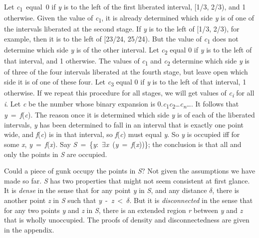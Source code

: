 Let \textit{c}\textsubscript{1}~equal~0 if \textit{y} is to the left of the first liberated interval, [1/3, 2/3), and 1 otherwise. Given the value of \textit{c}\textsubscript{1}, it is already determined which side \textit{y} is of one of the intervals liberated at the second stage. If \textit{y} is to the left of [1/3, 2/3), for example, then it is to the left of [23/24, 25/24). But the value of \textit{c}\textsubscript{1} does not determine which side \textit{y} is of the other interval. Let \textit{c}\textsubscript{2} equal 0 if \textit{y} is to the left of that interval, and 1 otherwise. The values of \textit{c}\textsubscript{1} and \textit{c}\textsubscript{2} determine which side \textit{y} is of three of the four intervals liberated at the fourth stage, but leave open which side it is of one of these four. Let \textit{c}\textsubscript{3} equal 0 if \textit{y} is to the left of that interval, 1 otherwise. If we repeat this procedure for all stages, we will get values of \textit{c}\textit{\textsubscript{i}} for all \textit{i}. Let \textit{c} be the number whose binary expansion is 0.\textit{c}\textsubscript{1}\textit{c}\textsubscript{2}{\dots}\textit{c}\textit{\textsubscript{n}}{\dots}. It follows that \textit{y}~=~\textit{f}(\textit{c}). The reason once it is determined which side \textit{y} is of each of the liberated intervals, \textit{y} has been determined to fall in an interval that is exactly one point wide, and \textit{f}(\textit{c}) is in that interval, so \textit{f}(\textit{c}) must equal \textit{y}. So \textit{y} is occupied iff for some \textit{x}, \textit{y}~=~\textit{f}(\textit{x}). Say \textit{S}~=~\{\textit{y}:~${\exists}$\textit{x}~(\textit{y}~=~\textit{f}(\textit{x}))\}; the conclusion is that all and only the points in \textit{S} are occupied.

Could a piece of gunk occupy the points in \textit{S}? Not given the assumptions we have made so far. \textit{S} has two properties that might not seem consistent at first glance. It is \textit{dense} in the sense that for any point \textit{y} in \textit{S}, and any distance ${\delta}$, there is another point \textit{z} in \textit{S} such that {\textbar}\textit{y}~\nobreakdash-~\textit{z}{\textbar}~{\textless}~${\delta}$. But it is \textit{disconnected} in the sense that for any two points \textit{y} and \textit{z} in \textit{S}, there is an extended region \textit{r} between \textit{y} and \textit{z} that is wholly unoccupied. The proofs of density and disconnectedness are given in the appendix.

